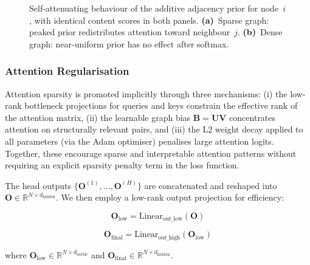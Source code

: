 \documentclass[final,1p,times]{elsarticle}
\begin{document}
\begin{figure}[!ht]
\caption{Self-attenuating behaviour of the additive adjacency prior for node~$i$, with identical content scores in both panels. \textbf{(a)}~Sparse graph: peaked prior redistributes attention toward neighbour~$j$. \textbf{(b)}~Dense graph: near-uniform prior has no effect after softmax.}
\label{fig:self_regulating}
\end{figure}

\subsubsection{Attention Regularisation}

Attention sparsity is promoted implicitly through three mechanisms: (i) the low-rank bottleneck projections for queries and keys constrain the effective rank of the attention matrix, (ii) the learnable graph bias $\mathbf{B} = \mathbf{UV}$ concentrates attention on structurally relevant pairs, and (iii) the L2 weight decay applied to all parameters (via the Adam optimiser) penalises large attention logits. Together, these encourage sparse and interpretable attention patterns without requiring an explicit sparsity penalty term in the loss function.

The head outputs $\{\mathbf{O}^{(1)}, \ldots, \mathbf{O}^{(H)}\}$ are concatenated and reshaped into $\mathbf{O} \in \mathbb{R}^{N \times d_{\text{hidden}}}$. We then employ a low-rank output projection for efficiency:

\begin{equation}
\mathbf{O}_{\text{low}} = \text{Linear}_{\text{out\_low}}(\mathbf{O})
\end{equation}

\begin{equation}
\mathbf{O}_{\text{final}} = \text{Linear}_{\text{out\_high}}(\mathbf{O}_{\text{low}})
\end{equation}

where $\mathbf{O}_{\text{low}} \in \mathbb{R}^{N \times d_{\text{bottle}}}$ and $\mathbf{O}_{\text{final}} \in \mathbb{R}^{N \times d_{\text{hidden}}}$.
\end{document}
